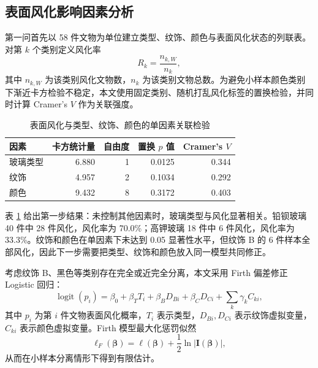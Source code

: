 \documentclass[UTF8,zihao=-4,a4paper,fontset=fandol]{ctexart}
\begin{document}
\subsection{表面风化影响因素分析}

第一问首先以 58 件文物为单位建立类型、纹饰、颜色与表面风化状态的列联表。对第 $k$ 个类别定义风化率
\begin{equation}
  R_k=\frac{n_{k,W}}{n_k},
  \label{eq:weather-rate}
\end{equation}
其中 $n_{k,W}$ 为该类别风化文物数，$n_k$ 为该类别文物总数。为避免小样本颜色类别下渐近卡方检验不稳定，本文使用固定类别、随机打乱风化标签的置换检验，并同时计算 Cramer's $V$ 作为关联强度。

\begin{table}[H]
  \centering
  \caption{表面风化与类型、纹饰、颜色的单因素关联检验}
  \label{tab:q1-association}
  \begin{tabular}{lrrrr}
    \toprule
    因素 & 卡方统计量 & 自由度 & 置换 $p$ 值 & Cramer's $V$ \\
    \midrule
    玻璃类型 & 6.880 & 1 & 0.0125 & 0.344 \\
    纹饰 & 4.957 & 2 & 0.1034 & 0.292 \\
    颜色 & 9.432 & 8 & 0.3172 & 0.403 \\
    \bottomrule
  \end{tabular}
\end{table}

表 \ref{tab:q1-association} 给出第一步结果：未控制其他因素时，玻璃类型与风化显著相关。铅钡玻璃 40 件中 28 件风化，风化率为 70.0\%；高钾玻璃 18 件中 6 件风化，风化率为 33.3\%。纹饰和颜色在单因素下未达到 0.05 显著性水平，但纹饰 B 的 6 件样本全部风化，因此下一步需要把类型、纹饰和颜色放入同一模型共同修正。

考虑纹饰 B、黑色等类别存在完全或近完全分离，本文采用 Firth 偏差修正 Logistic 回归：
\begin{equation}
  \operatorname{logit}(p_i)=\beta_0+\beta_TT_i+\beta_BD_{Bi}+\beta_CD_{Ci}+\sum_k\gamma_kC_{ki},
  \label{eq:firth-model}
\end{equation}
其中 $p_i$ 为第 $i$ 件文物表面风化概率，$T_i$ 表示类型，$D_{Bi},D_{Ci}$ 表示纹饰虚拟变量，$C_{ki}$ 表示颜色虚拟变量。Firth 模型最大化惩罚似然
\begin{equation}
  \ell_F(\bm\beta)=\ell(\bm\beta)+\frac{1}{2}\ln|\bm I(\bm\beta)|,
  \label{eq:firth}
\end{equation}
从而在小样本分离情形下得到有限估计。
\end{document}
